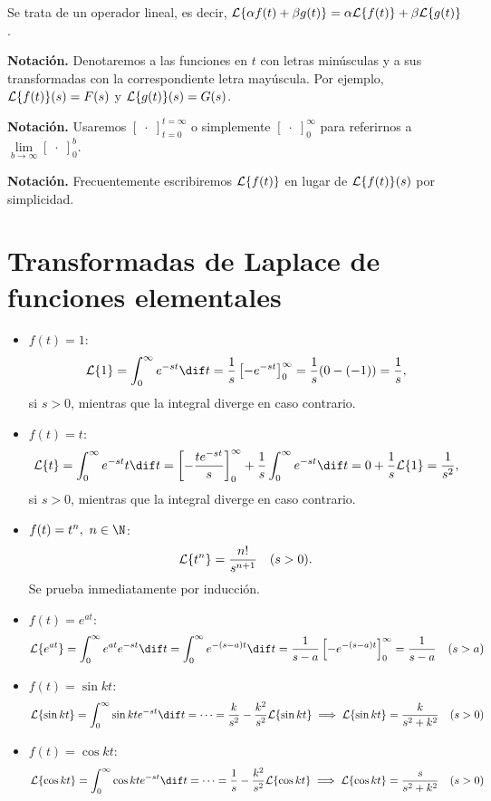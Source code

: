 \documentclass[../main.tex]{subfiles}
\begin{document}
\begin{remark}
  Se trata de un operador lineal, es decir, \(\mathcal{L}\{\alpha f(t) + \beta g(t)\} =
  \alpha \mathcal{L}\{f(t)\} + \beta \mathcal{L}\{g(t)\}\).
\end{remark}

\textbf{Notación.} Denotaremos a las funciones en \(t\) con letras minúsculas y
a sus transformadas con la correspondiente letra mayúscula. Por
ejemplo, \(\mathcal{L}\{f(t)\}(s) = F(s)\) y \(\mathcal{L}\{g(t)\}(s) = G(s)\).

\textbf{Notación.} Usaremos \([\;\cdot\;]_{t=0}^{t=\infty}\) o simplemente
\([\;\cdot\;]_0^\infty\) para referirnos a \(\lim \limits_{b \to \infty} [\;\cdot\;]_0^b\).

\textbf{Notación.} Frecuentemente escribiremos \(\mathcal{L}\{f(t)\}\) en lugar de
\(\mathcal{L}\{f(t)\}(s)\) por simplicidad.

\section{Transformadas de Laplace de funciones elementales}

\begin{itemize}
\item \(f(t) = 1\):
  \[\L\{1\} = \int_0^\infty e^{-st} \dif t = \frac{1}{s}
    \left[-e^{-st}\right]_0^\infty = \frac{1}{s}(0-(-1)) =
    \frac{1}{s},\]
  si \(s > 0\), mientras que la integral diverge en caso contrario.
\item \(f(t) = t\):
  \[\L\{t\} = \int_0^\infty e^{-st}t \dif t =
    \left[-\frac{te^{-st}}{s}\right]_0^\infty + \frac{1}{s} \int_0^\infty
    e^{-st} \dif t = 0 + \frac{1}{s} \L\{1\} = \frac{1}{s^2},\]
  si \(s > 0\), mientras que la integral diverge en caso contrario.
\item \(f(t) = t^n,\ n \in \N\):
  \[\mathcal{L}\{t^n\} = \frac{n!}{s^{n+1}} \quad (s>0).\]
  Se prueba inmediatamente por inducción.
\item \(f(t) = e^{at}\):
  \[\L\{e^{at}\} = \int_0^\infty e^{at}e^{-st} \dif t = \int_0^\infty
    e^{-(s-a)t} \dif t = \frac{1}{s-a}\left[-e^{-(s-a)t}\right]_0^\infty =
    \frac{1}{s-a} \quad (s>a)\]
\item \(f(t) = \sin kt\):
  \[\L\{\sin kt\} = \int_0^\infty \sin kt e^{-st} \dif t = \cdots = \frac{k}{s^2} -
    \frac{k^2}{s^2} \L\{\sin kt\} \implies \L\{\sin kt\} = \frac{k}{s^2+k^2}
    \quad (s>0)\]
\item \(f(t) = \cos kt\):
  \[\L\{\cos kt\} = \int_0^\infty \cos kt e^{-st} \dif t = \cdots = \frac{1}{s} -
    \frac{k^2}{s^2}\L\{\cos kt\} \implies  \L\{\cos kt\} = \frac{s}{s^2+k^2}
    \quad (s>0)\]
\end{itemize}
\end{document}
